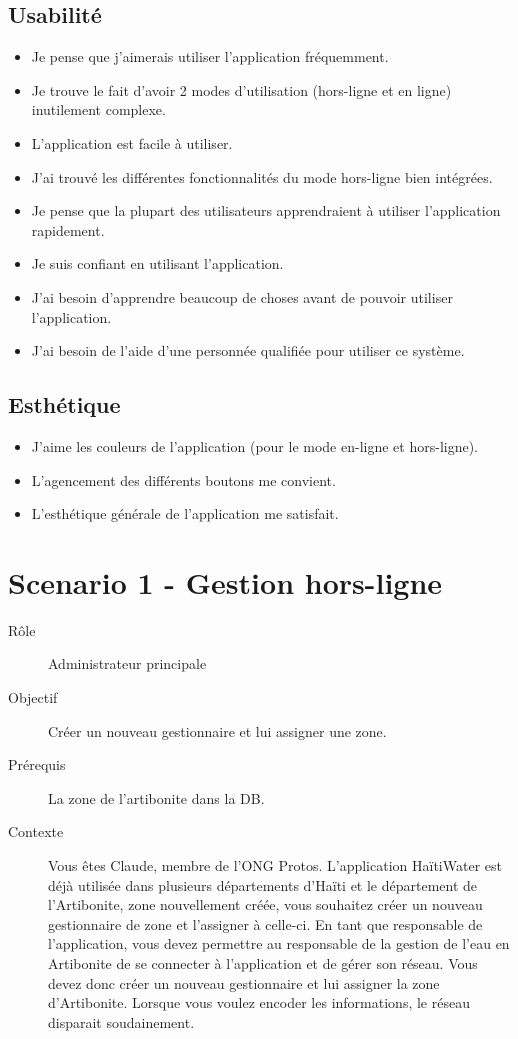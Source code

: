 \documentclass{EPL-master-thesis-covers-FR}
\begin{document}
				\subsection*{Usabilité}
					\begin{itemize}
						\item Je pense que j'aimerais utiliser l'application fréquemment.
						\item Je trouve le fait d'avoir 2 modes d'utilisation (hors-ligne et en ligne) inutilement complexe.
						\item L'application est facile à utiliser.
						\item J'ai trouvé les différentes fonctionnalités du mode hors-ligne bien intégrées.
						\item Je pense que la plupart des utilisateurs apprendraient à utiliser l'application rapidement.
						\item Je suis confiant en utilisant l'application.
						\item J'ai besoin d'apprendre beaucoup de choses avant de pouvoir utiliser l'application.
						\item J'ai besoin de l'aide d'une personnée qualifiée pour utiliser ce système.
					\end{itemize}
				\subsection*{Esthétique}
					\begin{itemize}
						\item J'aime les couleurs de l'application (pour le mode en-ligne et hors-ligne).
						\item L'agencement des différents boutons me convient.
						\item L'esthétique générale de l'application me satisfait.				
					\end{itemize}
					
\newpage
			\section*{Scenario 1 - Gestion hors-ligne}
				\begin{description}
					\item[Rôle] Administrateur principale
					\item[Objectif] Créer un nouveau gestionnaire et lui assigner une zone. 
					\item[Prérequis] La zone de l'artibonite dans la DB.
					\item[Contexte] Vous êtes Claude, membre de l’ONG Protos. L’application HaïtiWater est déjà utilisée dans plusieurs départements d’Haïti et le département de l’Artibonite, zone nouvellement créée, vous souhaitez créer un nouveau gestionnaire de zone et l’assigner à celle-ci. En tant que responsable de l’application, vous devez permettre au responsable de la gestion de l’eau en Artibonite de se connecter à l’application et de gérer son réseau. Vous devez donc créer un nouveau gestionnaire et lui assigner la zone d’Artibonite. Lorsque vous voulez encoder les informations, le réseau disparait soudainement. 
				\end{description}
							
\end{document}
